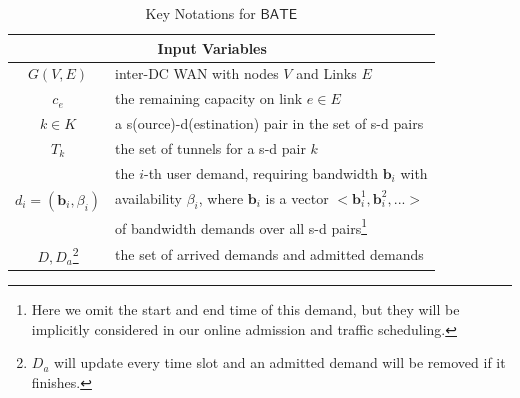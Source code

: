 \documentclass[sigconf]{acmart}
\begin{document}
\begin{table}[h!]
\small
\centering
\caption{Key Notations for $\mathsf{BATE}$}\label{Notation}
\renewcommand{\arraystretch}{1.0}
\begin{tabular}{ccccccc}  \toprule \toprule 
\setlength{\tabcolsep}{5pt}
&\textbf{Input Variables}\\
\hline
$G(V,E)$ &\multicolumn{6}{|l}{inter-DC WAN with nodes $V$ and Links $E$}\\
\hline
$c_e$ &\multicolumn{6}{|l}{the remaining capacity on link $e \in E$}\\
\hline
$k\in K$ &\multicolumn{6}{|l}{a s(ource)-d(estination) pair in the set of s-d pairs}\\
\hline
$T_{k}$ &\multicolumn{6}{|l}{the set of tunnels for a s-d pair $k$}\\
\hline
\multirow{3}{*}{$d_i=(\mathbf{b}_i, \beta_i)$}&\multicolumn{6}{|l}{the $i$-th user demand, requiring bandwidth $\mathbf{b}_i$ with }\\
&\multicolumn{6}{|l}{ availability $\beta_i$, where $\mathbf{b}_i$ is a vector $<\mathbf{b}_i^1, \mathbf{b}_i^2, ...>$}\\
&\multicolumn{6}{|l}{of bandwidth demands over all s-d pairs\footnote{Here we omit the start and end time of this demand, but they will be implicitly considered in our online admission and traffic scheduling.}} \\
\hline
$D, D_a$\footnote{$D_a$ will update every time slot and an admitted demand will be removed if it finishes.} &\multicolumn{6}{|l}{the set of arrived demands and admitted demands}\\

\end{tabular}
\end{table}
\end{document}
